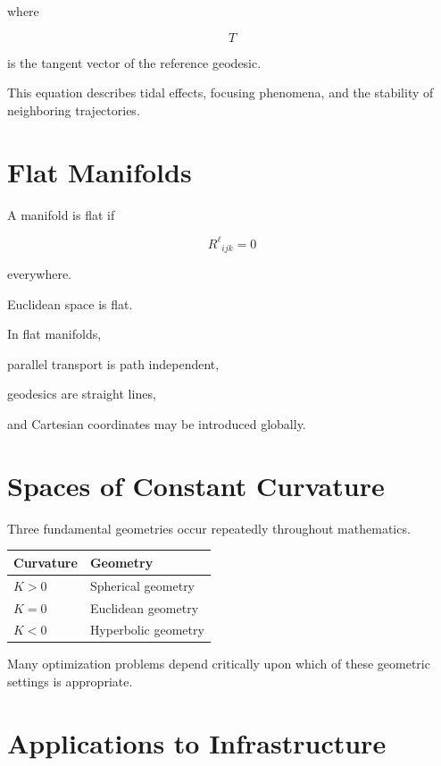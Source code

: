 \documentclass[11pt,fleqn]{book}
\numberwithin{equation}{chapter}
\theoremstyle{plain}
\theoremstyle{definition}
\theoremstyle{remark}
\begin{document}
where

\[
T
\]

is the tangent vector of the reference geodesic.

This equation describes tidal effects, focusing phenomena, and the
stability of neighboring trajectories.


\section{Flat Manifolds}

A manifold is flat if

\[
\boxed{
R^\ell{}_{ijk}
=
0
}
\]

everywhere.

Euclidean space is flat.

In flat manifolds,

parallel transport is path independent,

geodesics are straight lines,

and Cartesian coordinates may be introduced globally.


\section{Spaces of Constant Curvature}

Three fundamental geometries occur repeatedly throughout mathematics.

\begin{center}
\begin{tabular}{ll}
\toprule
Curvature & Geometry\\
\midrule
$K>0$ & Spherical geometry\\
$K=0$ & Euclidean geometry\\
$K<0$ & Hyperbolic geometry\\
\bottomrule
\end{tabular}
\end{center}

Many optimization problems depend critically upon which of these
geometric settings is appropriate.


\section{Applications to Infrastructure}
\end{document}
